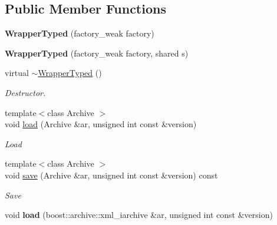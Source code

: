 \subsection*{Public Member Functions}
\begin{DoxyCompactItemize}
\item 
\hypertarget{classNeb_1_1WrapperTyped_ab3ae54407d5d88247591a7d05d181b4a}{{\bfseries Wrapper\-Typed} (factory\-\_\-weak factory)}\label{classNeb_1_1WrapperTyped_ab3ae54407d5d88247591a7d05d181b4a}

\item 
\hypertarget{classNeb_1_1WrapperTyped_a390ac7ae4c75440e417c85f042f0d6b4}{{\bfseries Wrapper\-Typed} (factory\-\_\-weak factory, shared s)}\label{classNeb_1_1WrapperTyped_a390ac7ae4c75440e417c85f042f0d6b4}

\item 
\hypertarget{classNeb_1_1WrapperTyped_acca2803bb2a5c1ca4b3b5ff51a04b421}{virtual \hyperlink{classNeb_1_1WrapperTyped_acca2803bb2a5c1ca4b3b5ff51a04b421}{$\sim$\-Wrapper\-Typed} ()}\label{classNeb_1_1WrapperTyped_acca2803bb2a5c1ca4b3b5ff51a04b421}

\begin{DoxyCompactList}\small\item\em Destructor. \end{DoxyCompactList}\item 
\hypertarget{classNeb_1_1WrapperTyped_a293a6083747b145c8b9db4a9f1410f89}{{\footnotesize template$<$class Archive $>$ }\\void \hyperlink{classNeb_1_1WrapperTyped_a293a6083747b145c8b9db4a9f1410f89}{load} (Archive \&ar, unsigned int const \&version)}\label{classNeb_1_1WrapperTyped_a293a6083747b145c8b9db4a9f1410f89}

\begin{DoxyCompactList}\small\item\em Load \end{DoxyCompactList}\item 
\hypertarget{classNeb_1_1WrapperTyped_a756a81384782fe7820f383ea989c9ec1}{{\footnotesize template$<$class Archive $>$ }\\void \hyperlink{classNeb_1_1WrapperTyped_a756a81384782fe7820f383ea989c9ec1}{save} (Archive \&ar, unsigned int const \&version) const }\label{classNeb_1_1WrapperTyped_a756a81384782fe7820f383ea989c9ec1}

\begin{DoxyCompactList}\small\item\em Save \end{DoxyCompactList}\item 
\hypertarget{classNeb_1_1WrapperTyped_a2fffc14882368b94658a3cbc50ba2a99}{void {\bfseries load} (boost\-::archive\-::xml\-\_\-iarchive \&ar, unsigned int const \&version)}\label{classNeb_1_1WrapperTyped_a2fffc14882368b94658a3cbc50ba2a99}


\end{DoxyCompactItemize}
